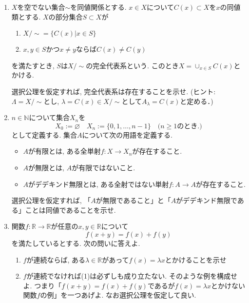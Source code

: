 \documentclass[dvipdfmx,a4paper,11pt]{article}
\newcommand{\R}{\mathbb{R}}
\newcommand{\N}{\mathbb{N}}
\theoremstyle{definition}
\begin{document}
 \begin{enumerate}[label=\textbf{問}\ref*{sec-9}.\arabic*]
 
  \item  \label{5-complete-rep}$X$を空でない集合$\sim$を同値関係とする. $x \in X$について$C(x) \subset X$を$x$の同値類とする.
 $X$の部分集合$S \subset X$が
 \begin{enumerate}[label=(\arabic*).]
 \setlength{\parskip}{0cm}
  \setlength{\itemsep}{0pt}
  \item $X/\sim = \{ C(x) | x \in S\}$
  \item $x, y \in S$かつ$x \neq y$ならば$C(x) \neq C(y)$
  \end{enumerate}
を満たすとき, $S$は$X /\sim$の完全代表系という. 
このとき$X = \cup_{x \in S}C(x)$とかける. 
 
 選択公理を仮定すれば, 完全代表系は存在することを示せ. (ヒント: $\Lambda=X/\sim$とし, $\lambda=C(x) \in X/\sim$として$A_{\lambda}=C(x)$と定める．)

\item   $n \in \N$について集合$X_n$を
 $$
 X_0:=\varnothing 
 \quad
 X_{n}:=\{ 0,1,\ldots, n-1\} \quad \text{($n \ge 1$のとき.)}
 $$
 として定義する.
 集合$A$について次の用語を定義する. 
  \begin{itemize}
 \setlength{\parskip}{0cm}
  \setlength{\itemsep}{0pt}
\item $A$が有限とは, ある全単射$f : X \to X_n$が存在すること.
\item $A$が無限とは, $A$が有限ではないこと.
\item $A$がデデキンド無限とは, ある全射ではない単射$f : A \to A$が存在すること.
\end{itemize}
選択公理を仮定すれば, 「$A$が無限であること」と「$A$がデデキンド無限である」ことは同値であることを示せ. 

\item  関数$f : \R \to \R$が任意の$x,y \in \R$について
$$
f(x+y)=f(x) + f(y)
$$
を満たしているとする. 次の問いに答えよ. 
 \begin{enumerate}[label=(\arabic*).]
 \setlength{\parskip}{0cm}
  \setlength{\itemsep}{0pt}
  \item $f$が連続ならば, ある$\lambda \in \R$があって$f(x)=\lambda x$とかけることを示せ
  \item $f$が連続でなければ(1)は必ずしも成り立たない. そのような例を構成せよ. つまり「$f(x+y)=f(x) + f(y)$であるが$f(x) = \lambda x$とかけない関数$f$の例」を一つあげよ. なお選択公理を仮定して良い. 
  \end{enumerate}
  

\end{enumerate}
\end{document}
